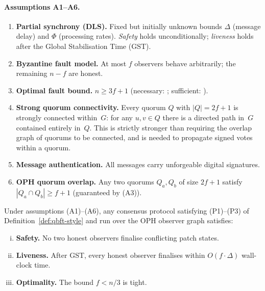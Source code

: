 \paragraph{Assumptions A1--A6.}
\begin{enumerate}[(A1)]
  \item \textbf{Partial synchrony (DLS).}
        Fixed but initially unknown bounds $\Delta$ (message delay) and
        $\Phi$ (processing rates).
        \emph{Safety} holds unconditionally;
        \emph{liveness} holds after the Global Stabilisation Time (\textrm{GST}).
  \item \textbf{Byzantine fault model.}
        At most $f$ observers behave arbitrarily; the remaining $n-f$ are honest.
  \item \textbf{Optimal fault bound.}
        $n \geq 3f+1$ (necessary: \cite{Lamport1982}; sufficient: \cite{Lamport1982}).
  \item \textbf{Strong quorum connectivity.}
        Every quorum $Q$ with $|Q|=2f+1$ is strongly connected within~$G$:
        for any $u,v\in Q$ there is a directed path in~$G$ contained
        entirely in~$Q$.
        This is strictly stronger than requiring the overlap graph of
        quorums to be connected, and is needed to propagate signed votes
        within a quorum.
  \item \textbf{Message authentication.}
        All messages carry unforgeable digital signatures.
  \item \textbf{OPH quorum overlap.}
        Any two quorums $Q_a, Q_b$ of size $2f+1$ satisfy
        $|Q_a\cap Q_b|\geq f+1$ (guaranteed by (A3)).
\end{enumerate}

\begin{theorem}
\label{thm:qbft-safety}
Under assumptions (A1)--(A6), any consensus protocol satisfying
(P1)--(P3) of Definition~\ref{def:qbft-style} and run over the
\textrm{OPH} observer graph satisfies:
\begin{enumerate}[(i)]
  \item \textbf{Safety.} No two honest observers finalise conflicting
        patch states.
  \item \textbf{Liveness.} After \textrm{GST}, every honest observer
        finalises within $O(f\cdot\Delta)$ wall-clock time.
  \item \textbf{Optimality.} The bound $f<n/3$ is tight.
\end{enumerate}
\end{theorem}

